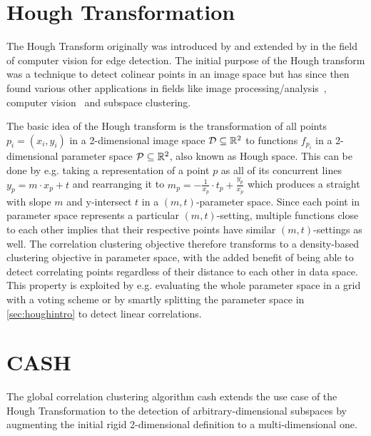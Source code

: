 
\section{Hough Transformation}\label{sec:houghintro}
The Hough Transform originally was introduced by \textcite{houghOriginal1962method} and extended by \textcite{rosenfeld1969picture} in the field of computer vision for edge detection\cite{houghhistoryhart2009hough}. The initial purpose of the Hough transform was a technique to detect colinear points in an image space but has since then found various other applications in fields like image processing/analysis~\cite{rosenfeld1969picture,ballard1981generalizing}, computer vision~\cite{davies2004machine} and subspace clustering\cite{CASHachtert2008robust}.

The basic idea of the Hough transform is the transformation of all points $p_i = (x_i,y_i)$ in a 2-dimensional image space $\mathcal{D} \subseteq \mathbb{R}^2$ to functions $f_{p_i}$ in a 2-dimensional parameter space $\mathcal{P} \subseteq \mathbb{R}^2$, also known as Hough space\cite{illingworth1988survey}. This can be done by e.g. taking a representation of a point $p$ as all of its concurrent lines $y_p = m \cdot x_p + t$ and rearranging it to $m_{p} = - \frac{1}{x_p} \cdot t_{p} + \frac{y_p}{x_p}$ which produces a straight with slope $m$ and y-intersect $t$ in a $(m,t)$-parameter space. Since each point in parameter space represents a particular $(m,t)$-setting, multiple functions close to each other implies that their respective points have similar $(m,t)$-settings as well. The correlation clustering objective therefore transforms to a density-based clustering objective in parameter space, with the added benefit of being able to detect correlating points regardless of their distance to each other in data space. This property is exploited by e.g. evaluating the whole parameter space in a grid with a voting scheme or by smartly splitting the parameter space in \autoref{sec:houghintro} to detect linear correlations. 

\section{CASH}\label{sec:cashintro}
The global correlation clustering algorithm \gls{cash} extends the use case of the Hough Transformation to the detection of arbitrary-dimensional subspaces by augmenting the initial rigid 2-dimensional definition to a multi-dimensional one. 

